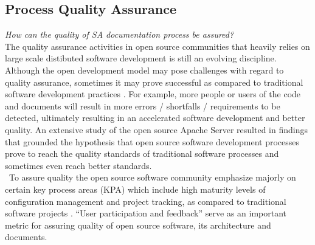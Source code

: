 \subsection{Process Quality Assurance}
\indent \emph {How can the quality of SA documentation process be assured?}
\newline
\\\indent The quality assurance activities in open source communities that heavily relies on large scale distibuted software development is still an evolving discipline. Although the open development model may pose challenges with regard to quality assurance, sometimes it may prove successful as compared to traditional software development practices \cite{Zhao2003}. For example, more people or users of the code and documents will result in more errors / shortfalls / requirements to be detected, ultimately resulting in an accelerated software development and better quality. An extensive study of the open source Apache Server \cite{Mockus2000} resulted in findings that grounded the hypothesis that open source software development processes prove to reach the quality standards of traditional software processes and sometimes even reach better standards.
\\\ To assure quality the open source software community emphasize majorly on certain key process areas (KPA) which include high maturity levels of configuration management and project tracking, as compared to traditional software projects \cite{Zhao2003}. \enquote{User participation and feedback} serve as an important metric for assuring quality of open source software, its architecture and documents. 

